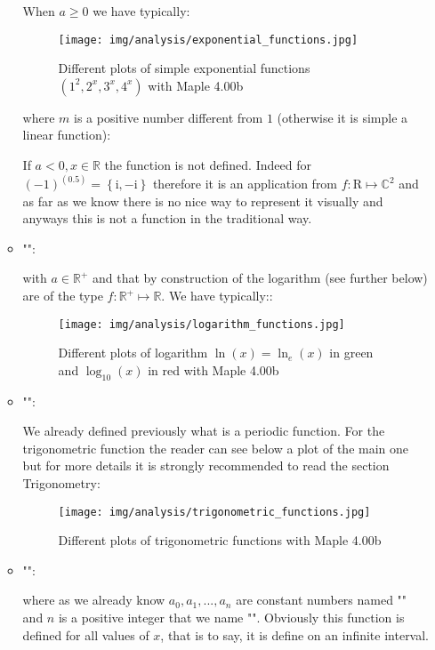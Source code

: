 \begin{enumerate}
\begin{itemize}
			When $a\geq 0$ we have typically:
			\begin{figure}[H]
				\centering
				\texttt{[image: img/analysis/exponential\_functions.jpg]}
				\caption{Different plots of simple exponential functions $(1^2,2^x,3^x,4^x)$ with Maple 4.00b}
			\end{figure}
			where $m$ is a positive number different from $1$ (otherwise it is simple a linear function):
			
			If $a<0,x\in\mathbb{R}$ the function is not defined. Indeed for $(-1)^(0.5)=\left\lbrace \mathrm{i},	-\mathrm{i}	\right\rbrace$ therefore it is an application from $f:\mathrm{R}\mapsto\mathbb{C}^2$ and as far as we know there is no nice way to represent it visually and anyways this is not a function in the traditional way.
			
			\item "":
				
			with $a\in\mathbb{R}^{+}$ and that by construction of the logarithm (see further below) are of the type $f:\mathbb{R}^{+}\mapsto \mathbb{R}$.
			We have typically::
			\begin{figure}[H]
				\centering
				\texttt{[image: img/analysis/logarithm\_functions.jpg]}
				\caption{Different plots of logarithm $\ln(x)=\ln_e(x)$ in green and $\log_10(x)$ in red with Maple 4.00b}
			\end{figure}
			
			\item "":
			
			We already defined previously what is a periodic function. For the trigonometric function the reader can see below a plot of the main one but for more details it is strongly recommended to read the section Trigonometry:
			\begin{figure}[H]
				\centering
				\texttt{[image: img/analysis/trigonometric\_functions.jpg]}
				\caption{Different plots of trigonometric functions with Maple 4.00b}
			\end{figure}
			
			\item "":
			
			
			where as we already know $a_0,a_1,...,a_n$ are constant numbers named "" and $n$ is a positive integer that we name "". Obviously this function is defined for all values of $x$, that is to say, it is define on an infinite interval.
			

\end{itemize}
\end{enumerate}
